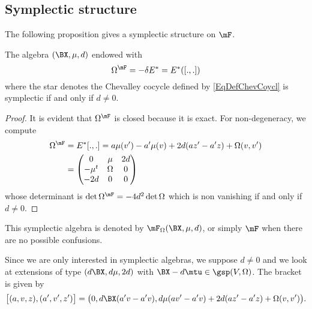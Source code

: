 \subsection{Symplectic structure}

The following proposition gives a symplectic structure on $\mF$.

\begin{proposition}   
The algebra $(\BX,\mu,d)$ endowed with
\begin{equation}
 \Omega^{\mF}=-\delta E^*=E^*([.,.])
 \end{equation}
where the star denotes the Chevalley cocycle defined by \eqref{EqDefChevCoycl} is symplectic if and only if $d\neq 0$.
\label{PropSymplestarEG}
\end{proposition}

\begin{proof}
It is evident that $\Omega^{\mF}$ is closed because it is exact. For non-degeneracy, we compute
\[ 
\begin{split}
\Omega^{\mF}&=E^*[.,.]=a\mu(v')-a'\mu(v)+2d(az'-a'z)+\Omega(v,v')\\
	&=\begin{pmatrix}
0	&	\mu	&	2d\\
-\mu^{t}&	\Omega	&	0\\
-2d	&	0	&	0	
\end{pmatrix}
\end{split}  
\]
whose determinant is $\det\Omega^{\mF}=-4d^{2}\det\Omega$ which is non vanishing if and only if $d\neq 0$.

\end{proof}

This symplectic algebra  is denoted by $\mF_{\Omega}(\BX ,\mu,d)$, or simply $\mF$ when there are no possible confusions.

Since we are only interested in symplectic algebras, we suppose $d\neq 0$ and we look at extensions of type $(d\BX ,d\mu,2d)$ with $\BX -d\mtu\in\gsp(V,\Omega)$. The bracket is given by
\begin{equation}   \label{EqCommGeneF}
\big[ (a,v,z),(a',v',z') \big]=\big( 0,d\BX (a'v-a'v),d\mu(av'-a'v)+2d(az'-a'z)+\Omega(v,v') \big).
\end{equation}

